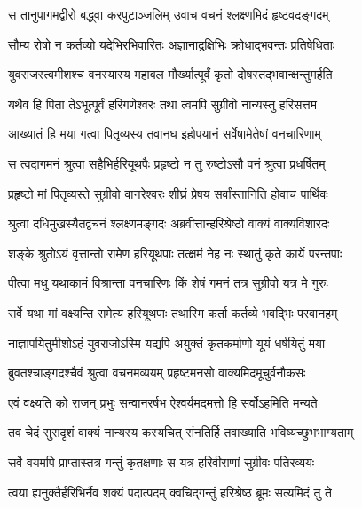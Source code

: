 \twolineshloka
{स तानुपागमद्वीरो बद्ध्वा करपुटाञ्जलिम्}
{उवाच वचनं श्लक्ष्णमिदं हृष्टवदङ्गदम्} %

\twolineshloka
{सौम्य रोषो न कर्तव्यो यदेभिरभिवारितः}
{अज्ञानाद्रक्षिभिः क्रोधाद्भवन्तः प्रतिषेधिताः} %

\twolineshloka
{युवराजस्त्वमीशश्च वनस्यास्य महाबल}
{मौर्ख्यात्पूर्वं कृतो दोषस्तद्भवान्क्षन्तुमर्हति} %

\twolineshloka
{यथैव हि पिता तेऽभूत्पूर्वं हरिगणेश्वरः}
{तथा त्वमपि सुग्रीवो नान्यस्तु हरिसत्तम} %

\twolineshloka
{आख्यातं हि मया गत्वा पितृव्यस्य तवानघ}
{इहोपयानं सर्वेषामेतेषां वनचारिणाम्} %

\twolineshloka
{स त्वदागमनं श्रुत्वा सहैभिर्हरियूथपैः}
{प्रहृष्टो न तु रुष्टोऽसौ वनं श्रुत्वा प्रधर्षितम्} %

\twolineshloka
{प्रहृष्टो मां पितृव्यस्ते सुग्रीवो वानरेश्वरः}
{शीघ्रं प्रेषय सर्वांस्तानिति होवाच पार्थिवः} %

\twolineshloka
{श्रुत्वा दधिमुखस्यैतद्वचनं श्लक्ष्णमङ्गदः}
{अब्रवीत्तान्हरिश्रेष्ठो वाक्यं वाक्यविशारदः} %

\twolineshloka
{शङ्के श्रुतोऽयं वृत्तान्तो रामेण हरियूथपाः}
{तत्क्षमं नेह नः स्थातुं कृते कार्ये परन्तपाः} %

\twolineshloka
{पीत्वा मधु यथाकामं विश्रान्ता वनचारिणः}
{किं शेषं गमनं तत्र सुग्रीवो यत्र मे गुरुः} %

\twolineshloka
{सर्वे यथा मां वक्ष्यन्ति समेत्य हरियूथपाः}
{तथास्मि कर्ता कर्तव्ये भवद्भिः परवानहम्} %

\twolineshloka
{नाज्ञापयितुमीशोऽहं युवराजोऽस्मि यद्यपि}
{अयुक्तं कृतकर्माणो यूयं धर्षयितुं मया} %

\twolineshloka
{ब्रुवतश्चाङ्गदश्चैवं श्रुत्वा वचनमव्ययम्}
{प्रहृष्टमनसो वाक्यमिदमूचुर्वनौकसः} %

\twolineshloka
{एवं वक्ष्यति को राजन् प्रभुः सन्वानरर्षभ}
{ऐश्वर्यमदमत्तो हि सर्वोऽहमिति मन्यते} %

\twolineshloka
{तव चेदं सुसदृशं वाक्यं नान्यस्य कस्यचित्}
{संनतिर्हि तवाख्याति भविष्यच्छुभभाग्यताम्} %

\twolineshloka
{सर्वे वयमपि प्राप्तास्तत्र गन्तुं कृतक्षणाः}
{स यत्र हरिवीराणां सुग्रीवः पतिरव्ययः} %

\twolineshloka
{त्वया ह्यनुक्तैर्हरिभिर्नैव शक्यं पदात्पदम्}
{क्वचिद्गन्तुं हरिश्रेष्ठ ब्रूमः सत्यमिदं तु ते} %

